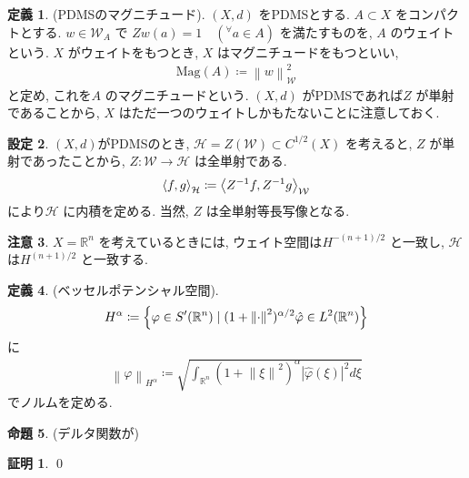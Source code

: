 \documentclass[10pt, fleqn, label-section=none]{bxjsarticle}
\theoremstyle{definition}
\newtheorem{dfn}{定義}[section]
\newtheorem{prop}[dfn]{命題}
\newtheorem{setting}[dfn]{設定}
\newtheorem*{pf*}{証明}
\newtheorem{remark}[dfn]{注意}
\newcommand{\any}{{}^{\forall}}
\newcommand{\cbra}[1]{\mleft\{#1\mright\}}
\newcommand{\tbra}[1]{\mleft\langle#1\mright\rangle}
\newcommand{\abs}[1]{\left|#1\right|}
\newcommand{\norm}[1]{\left\|#1\right\|}
\renewcommand{\;}{\, ; \,}
\newcommand{\Mag}{\textrm{Mag}}
\begin{document}
\begin{dfn}(PDMSのマグニチュード). $(X, d)$ をPDMSとする. $A \subset X$ をコンパクトとする. $w \in \mathcal W_A$ で
$Zw(a) = 1 \quad (\any a \in A)$ を満たすものを, $A$ のウェイトという. $X$ がウェイトをもつとき, $X$ はマグニチュードをもつといい, 
\begin{align*} \Mag(A) \coloneqq \norm{w} _{\mathcal W} ^2\end{align*}
と定め, これを$A$ のマグニチュードという. $(X, d)$ がPDMSであれば$Z$ が単射であることから, $X$ はただ一つのウェイトしかもたないことに注意しておく. 
\end{dfn}




\begin{setting}$(X, d)$がPDMSのとき, $\mathcal H = Z(\mathcal W) \subset C^{1/2}(X)$ を考えると, $Z$ が単射であったことから, $Z: \mathcal W \rightarrow \mathcal H$ は全単射である. 
\begin{align*} \tbra{f, g}_{\mathcal H} \coloneqq \tbra{Z^{-1}f, Z^{-1}g}_{\mathcal W} \end{align*}
により$\mathcal H$ に内積を定める. 当然, $Z$ は全単射等長写像となる. 
\end{setting}

\begin{remark}
$X = \mathbb R^n$ を考えているときには, ウェイト空間は$H^{-(n+1)/2}$ と一致し, $\mathcal H$ は$H^{(n+1)/2}$ と一致する. 
\end{remark}





\begin{dfn}(ベッセルポテンシャル空間). 
\begin{align*} H^\alpha \coloneqq \cbra{ \varphi \in S^\prime (\mathbb R^n) \mid (1 + \norm{\cdot} ^2) ^{\alpha/2} \hat \varphi \in L^2(\mathbb R^n)}  \end{align*}
に
\begin{align*} \norm{\varphi }_{H^\alpha} \coloneqq \sqrt{ \int_{\mathbb R^n} (1 + \norm \xi ^2) ^\alpha \abs{\hat \varphi(\xi)} ^2 d\xi }  \end{align*}
でノルムを定める. 
\end{dfn}

\begin{prop}(デルタ関数が)

\end{prop}
\begin{pf*}

\qed
\end{pf*}
\end{document}
